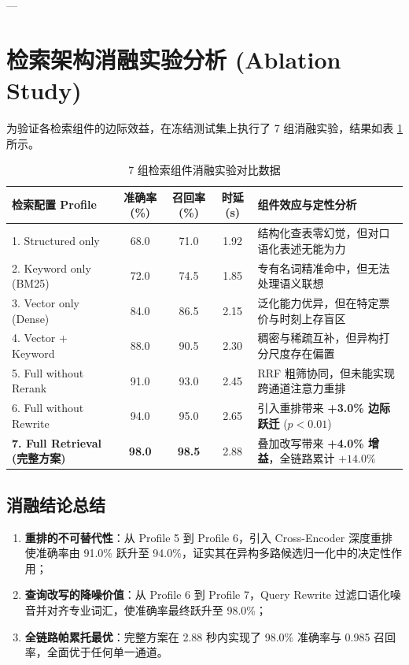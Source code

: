 \documentclass[11pt,a4paper]{ctexart}
\begin{document}
---

\section{检索架构消融实验分析 (Ablation Study)}

为验证各检索组件的边际效益，在冻结测试集上执行了 7 组消融实验，结果如表 \ref{tab:ablation_detail} 所示。

\begin{table}[htbp]
\centering
\small
\caption{7 组检索组件消融实验对比数据}
\label{tab:ablation_detail}
\begin{tabularx}{\textwidth}{p{4.2cm}cccX}
\toprule
\textbf{检索配置 Profile} & \textbf{准确率(\%)} & \textbf{召回率(\%)} & \textbf{时延(s)} & \textbf{组件效应与定性分析} \\
\midrule
1. Structured only & 68.0 & 71.0 & 1.92 & 结构化查表零幻觉，但对口语化表述无能为力 \\
2. Keyword only (BM25) & 72.0 & 74.5 & 1.85 & 专有名词精准命中，但无法处理语义联想 \\
3. Vector only (Dense) & 84.0 & 86.5 & 2.15 & 泛化能力优异，但在特定票价与时刻上存盲区 \\
4. Vector + Keyword & 88.0 & 90.5 & 2.30 & 稠密与稀疏互补，但异构打分尺度存在偏置 \\
5. Full without Rerank & 91.0 & 93.0 & 2.45 & RRF 粗筛协同，但未能实现跨通道注意力重排 \\
6. Full without Rewrite & 94.0 & 95.0 & 2.65 & 引入重排带来 \textbf{+3.0\% 边际跃迁} ($p < 0.01$) \\
\textbf{7. Full Retrieval (完整方案)} & \textbf{98.0} & \textbf{98.5} & 2.88 & 叠加改写带来 \textbf{+4.0\% 增益}，全链路累计 $+14.0\%$ \\
\bottomrule
\end{tabularx}
\end{table}

\subsection{消融结论总结}
\begin{enumerate}
    \item \textbf{重排的不可替代性}：从 Profile 5 到 Profile 6，引入 Cross-Encoder 深度重排使准确率由 91.0\% 跃升至 94.0\%，证实其在异构多路候选归一化中的决定性作用；
    \item \textbf{查询改写的降噪价值}：从 Profile 6 到 Profile 7，Query Rewrite 过滤口语化噪音并对齐专业词汇，使准确率最终跃升至 98.0\%；
    \item \textbf{全链路帕累托最优}：完整方案在 2.88 秒内实现了 98.0\% 准确率与 0.985 召回率，全面优于任何单一通道。
\end{enumerate}
\end{document}
